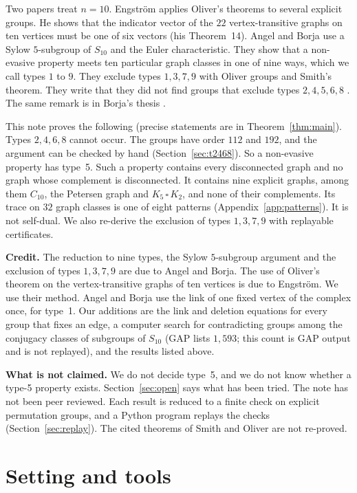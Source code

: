 \documentclass[11pt]{article}
\theoremstyle{plain}
\theoremstyle{definition}
\theoremstyle{remark}
\begin{document}
Two papers treat $n=10$.
Engstr\"om \cite{Eng} applies Oliver's theorems to several explicit groups.
He shows that the indicator vector of the $22$ vertex-transitive graphs on ten vertices must be one of six vectors (his Theorem~14).
Angel and Borja \cite{AB} use a Sylow $5$-subgroup of $S_{10}$ and the Euler characteristic.
They show that a non-evasive property meets ten particular graph classes in one of nine ways, which we call types $1$ to $9$.
They exclude types $1,3,7,9$ with Oliver groups and Smith's theorem.
They write that they did not find groups that exclude types $2,4,5,6,8$ \cite[Remark~5.2]{AB}.
The same remark is in Borja's thesis \cite[Remark~1.8.2]{Bor}.

This note proves the following (precise statements are in Theorem~\ref{thm:main}).
Types $2,4,6,8$ cannot occur.
The groups have order $112$ and $192$, and the argument can be checked by hand (Section~\ref{sec:t2468}).
So a non-evasive property has type~5.
Such a property contains every disconnected graph and no graph whose complement is disconnected.
It contains nine explicit graphs, among them $C_{10}$, the Petersen graph and $K_5\,\square\,K_2$, and none of their complements.
Its trace on $32$ graph classes is one of eight patterns (Appendix~\ref{app:patterns}).
It is not self-dual.
We also re-derive the exclusion of types $1,3,7,9$ with replayable certificates.

\medskip\noindent
\textbf{Credit.}
The reduction to nine types, the Sylow $5$-subgroup argument and the exclusion of types $1,3,7,9$ are due to Angel and Borja.
The use of Oliver's theorem on the vertex-transitive graphs of ten vertices is due to Engstr\"om.
We use their method.
Angel and Borja use the link of one fixed vertex of the complex once, for type~1.
Our additions are the link and deletion equations for every group that fixes an edge, a computer search for contradicting groups among the conjugacy classes of subgroups of $S_{10}$ (GAP lists $1{,}593$; this count is GAP output and is not replayed), and the results listed above.

\medskip\noindent
\textbf{What is not claimed.}
We do not decide type~5, and we do not know whether a type-5 property exists.
Section~\ref{sec:open} says what has been tried.
The note has not been peer reviewed.
Each result is reduced to a finite check on explicit permutation groups, and a Python program replays the checks (Section~\ref{sec:replay}).
The cited theorems of Smith and Oliver are not re-proved.

\section{Setting and tools}
\end{document}
